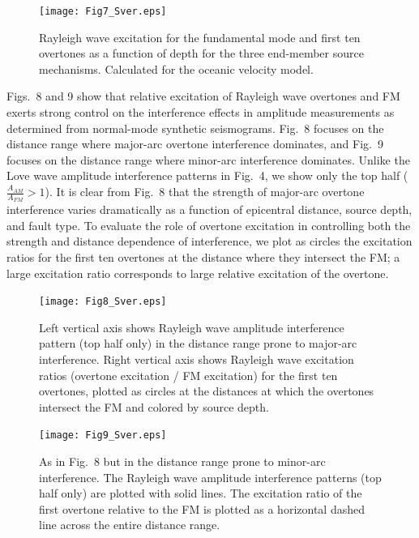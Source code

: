 \documentclass[extra,mreferee]{gji}
\begin{document}
      \begin{figure}
 \texttt{[image: Fig7\_Sver.eps]}
 \caption{Rayleigh wave excitation for the fundamental mode and first ten overtones as a function of depth for the three end-member source mechanisms. Calculated for the oceanic velocity model.}
 \end{figure}

 Figs.\ 8 and 9 show that relative excitation of Rayleigh wave overtones and FM exerts strong control on the interference effects in amplitude measurements as determined from normal-mode synthetic seismograms. Fig.\ 8 focuses on the distance range where major-arc overtone interference dominates, and Fig.\ 9 focuses on the distance range where minor-arc interference dominates. Unlike the Love wave amplitude interference patterns in Fig.\ 4, we show only the top half ($\frac{A_{AM}}{A_{FM}}>1$). It is clear from Fig.\ 8 that the strength of major-arc overtone interference varies dramatically as a function of epicentral distance, source depth, and fault type. To evaluate the role of overtone excitation in controlling both the strength and distance dependence of interference, we plot as circles the excitation ratios for the first ten overtones at the distance where they intersect the FM; a large excitation ratio corresponds to large relative excitation of the overtone.

\begin{figure}
 \texttt{[image: Fig8\_Sver.eps]}
 \caption{ Left vertical axis shows Rayleigh wave amplitude interference pattern (top half only) in the distance range prone to major-arc interference. Right vertical axis shows Rayleigh wave excitation ratios (overtone excitation / FM excitation) for the first ten overtones, plotted as circles at the distances at which the overtones intersect the FM and colored by source depth. }
\end{figure}
     
         \begin{figure}
 \texttt{[image: Fig9\_Sver.eps]}
 \caption{As in Fig.\ 8 but in the distance range prone to minor-arc interference. The Rayleigh wave amplitude interference patterns (top half only) are plotted with solid lines. The excitation ratio of the first overtone relative to the FM is plotted as a horizontal dashed line across the entire distance range. }
     \end{figure}     
     
\end{document}
